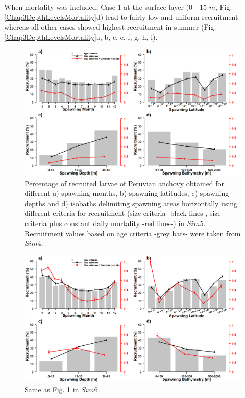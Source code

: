 When mortality was included, Case 1 at the surface layer (0 - 15 $m$, Fig. \ref{Chap3DepthLevelsMortality}d) lead to fairly low and uniform recruitment whereas all other cases showed highest recruitment in summer (Fig. \ref{Chap3DepthLevelsMortality}a, b, c, e, f, g, h, i).\\

\begin{figure}[H]
	\includegraphics[width=1.0\textwidth]{figures/Chap3Case1CriterionCompar.png}
	\centering
	\caption{Percentage of recruited larvae of Peruvian anchovy obtained for different a) spawning months, b) spawning latitudes, c) spawning depths and d) isobaths delimiting spawning areas horizontally using different criteria for recruitment (size criteria -black lines-, size criteria plus constant daily mortality -red lines-) in $Sim 5$. Recruitment values based on age criteria -grey bars- were taken from $Sim 4$.}
	\label{Chap3Case1CriterionCompar}
\end{figure}

\begin{figure}[H]
	\includegraphics[width=1.0\textwidth]{figures/Chap3Case2CriterionCompar.png}
	\centering
	\caption{Same as Fig. \ref{Chap3Case1CriterionCompar} in $Sim 6$.}
	\label{Chap3Case2CriterionCompar}
\end{figure}

